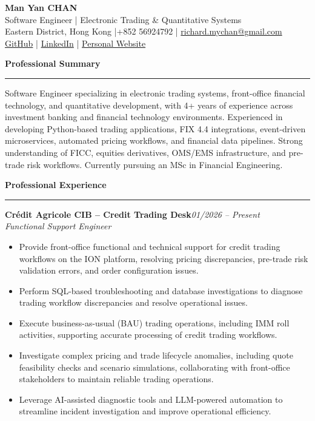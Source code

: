 \documentclass[10pt,a4paper]{article}
\newcommand{\resumesection}[1]{%
    \vspace{1.4ex}
    {\large\bfseries #1}\par
    \vspace{0.4ex}
    \hrule
    \vspace{0.7ex}
}
\newcommand{\experience}[3]{%
    \Needspace{5\baselineskip}
    \textbf{#1}\hfill\textit{#3}\\
    \textit{#2}\par
}
\begin{document}
\begin{center}
    {\LARGE\bfseries Man Yan CHAN}\\[1mm]
    {\normalsize Software Engineer | Electronic Trading \& Quantitative Systems}\\[1.5mm]
    Eastern District, Hong Kong
    \quad|\quad +852 56924792
    \quad|\quad
    \href{mailto:richard.mychan@gmail.com}{richard.mychan@gmail.com}\\[1mm]
    \href{https://github.com/manyan-chan}{GitHub}
    \quad|\quad
    \href{https://www.linkedin.com/in/richard-chanmy}{LinkedIn}
    \quad|\quad
    \href{https://manyan-chan.github.io}{Personal Website}
\end{center}

\resumesection{Professional Summary}

Software Engineer specializing in electronic trading systems,
front-office financial technology, and quantitative development,
with 4+ years of experience across investment banking and
financial technology environments. Experienced in developing
Python-based trading applications, FIX 4.4 integrations,
event-driven microservices, automated pricing workflows,
and financial data pipelines. Strong understanding of FICC,
equities derivatives, OMS/EMS infrastructure, and pre-trade
risk workflows. Currently pursuing an MSc in Financial Engineering.

\resumesection{Professional Experience}

\experience
{Crédit Agricole CIB -- Credit Trading Desk}
{Functional Support Engineer}
{01/2026 -- Present}

\begin{itemize}
    \item Provide front-office functional and technical support
    for credit trading workflows on the ION platform, resolving
    pricing discrepancies, pre-trade risk validation errors,
    and order configuration issues.

    \item Perform SQL-based troubleshooting and database
    investigations to diagnose trading workflow discrepancies
    and resolve operational issues.

    \item Execute business-as-usual (BAU) trading operations,
    including IMM roll activities, supporting accurate
    processing of credit trading workflows.

    \item Investigate complex pricing and trade lifecycle
    anomalies, including quote feasibility checks and
    scenario simulations, collaborating with front-office
    stakeholders to maintain reliable trading operations.

    \item Leverage AI-assisted diagnostic tools and
    LLM-powered automation to streamline incident
    investigation and improve operational efficiency.
\end{itemize}
\end{document}
